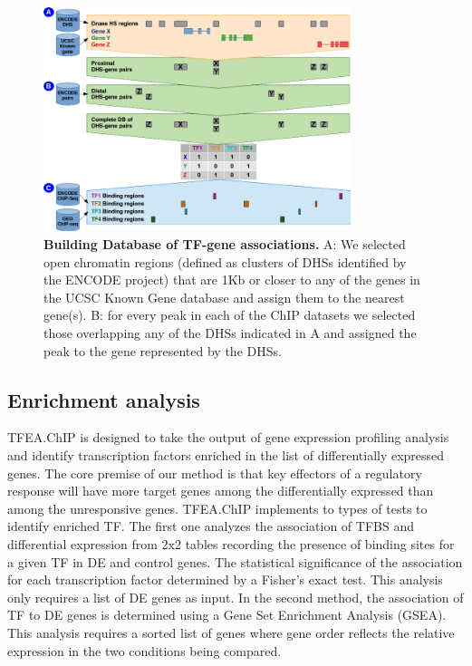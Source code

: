 \documentclass[10pt,letterpaper]{article}
\begin{document}
	\begin{figure}[h]
		\centering
		\includegraphics[width=0.8\textwidth]{fig2_LPO_v2}
		\caption{{\bf Building Database of TF-gene associations.} A: We selected open chromatin regions (defined as clusters of DHSs identified by the ENCODE project) that are 1Kb or closer to any of the genes in the UCSC Known Gene database and assign them to the nearest gene(s). B: for every peak in each of the ChIP datasets we selected those overlapping any of the DHSs indicated in A and assigned the peak to the gene represented by the DHSs.}
		\label{fig2}
	\end{figure}
	
	\subsection*{Enrichment analysis}
	TFEA.ChIP is designed to take the output of gene expression profiling analysis and identify transcription factors enriched in the list of differentially expressed genes. The core premise of our method is that key effectors of a regulatory response will have more target genes among the differentially expressed than among the unresponsive genes. TFEA.ChIP implements to types of tests to identify enriched TF. The first one analyzes the association of TFBS and differential expression from 2x2 tables recording the presence of binding sites for a given TF in DE and control genes. The statistical significance of the association for each transcription factor determined by a Fisher’s exact test. This analysis only requires a list of DE genes as input. In the second method, the association of TF to DE genes is determined using a Gene Set Enrichment Analysis (GSEA)\cite{GSEA1}. This analysis requires a sorted list of genes where gene order reflects the relative expression in the two conditions being compared.
	
\end{document}

